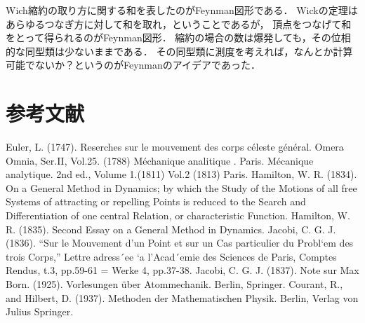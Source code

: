 \documentclass[uplatex,dvipdfmx]{jsreport}
\begin{document}
Wich縮約の取り方に関する和を表したのがFeynman図形である．
Wickの定理はあらゆるつなぎ方に対して和を取れ，ということであるが，
頂点をつなげて和をとって得られるのがFeynman図形．
縮約の場合の数は爆発しても，その位相的な同型類は少ないままである．
その同型類に測度を考えれば，なんとか計算可能でないか？というのがFeynmanのアイデアであった．

\chapter{参考文献}

\begin{thebibliography}{99}
    Euler, L. (1747). Reserches sur le mouvement des corps céleste général. Omera Omnia, Ser.II, Vol.25.
    (1788) Méchanique analitique . Paris.
    Mécanique analytique. 2nd ed., Volume 1.(1811) Vol.2 (1813) Paris.
    Hamilton, W. R. (1834). On a General Method in Dynamics; by which the Study of the Motions of all
    free Systems of attracting or repelling Points is reduced to the Search and Differentiation
    of one central Relation, or characteristic Function.
    Hamilton, W. R. (1835). Second Essay on a General Method in Dynamics.
    Jacobi, C. G. J. (1836).
    “Sur le Mouvement d’un Point et sur un Cas particulier du Probl`em des trois Corps,” Lettre adress´ee
`a l’Acad´emie des Sciences de Paris, Comptes Rendus, t.3, pp.59-61 = Werke 4, pp.37-38.
    Jacobi, C. G. J. (1837). Note sur
    Max Born. (1925). Vorlesungen über Atommechanik. Berlin, Springer.
    Courant, R., and Hilbert, D. (1937). Methoden der Mathematischen Physik. Berlin, Verlag von Julius Springer.
\end{thebibliography}
\end{document}
